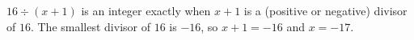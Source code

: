$16\div(x+1)$ is an integer exactly when $x+1$ is a (positive or negative) divisor of $16$. The smallest divisor of $16$ is $-16$, so $x+1=-16$ and $x=\boxed{-17}$.
